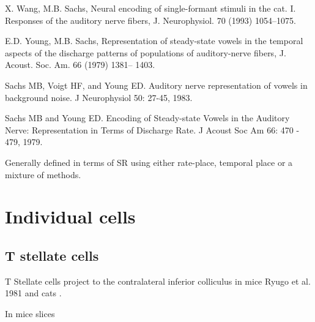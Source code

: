 \documentclass[10pt,a4paper]{article}
\begin{document}
X. Wang, M.B. Sachs, Neural encoding of single-formant stimuli in
the cat. I. Responses of the auditory nerve fibers, J. Neurophysiol.
70 (1993) 1054--1075.

E.D. Young, M.B. Sachs, Representation of steady-state vowels
in the temporal aspects of the discharge patterns of populations
of auditory-nerve fibers, J. Acoust. Soc. Am. 66 (1979) 1381--
1403.

Sachs MB, Voigt HF, and Young ED. Auditory nerve representation of vowels in
background noise. J Neurophysiol 50: 27-45, 1983.

Sachs MB and Young ED. Encoding of Steady-state Vowels in the Auditory Nerve:
Representation in Terms of Discharge Rate. J Acoust Soc Am 66: 470 - 479, 1979.

Generally defined in terms of SR using either rate-place, temporal place or a
mixture of methods.

\section{Individual cells}
\subsection[T stellate cells]{T stellate cells}

T Stellate cells project to the contralateral inferior colliculus in mice
\citep{OertelWuEtAl:1990,RoullierRyugo:1984} Ryugo et al. 1981 and
cats \citep{Adams:1979,Adams:1983,Cant:1982,Oliver:1987,Osen:1972,RothAitkinEtAl:1978}.

In mice slices \citep{FerragamoGoldingEtAl:1998a}
\end{document}
